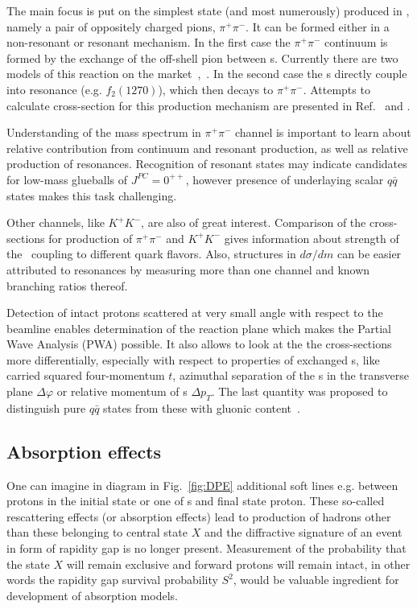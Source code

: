 The main focus is put on the simplest state (and most numerously) produced in \DPE, namely a pair of oppositely charged pions, $\pi^{+}\pi^{-}$. It can be formed either in a non-resonant or resonant mechanism. In the first case the $\pi^{+}\pi^{-}$ continuum is formed by the exchange of the off-shell pion between \Pomeron s. Currently there are two models of this reaction on the market~\cite{LSmodel,LSmodel2},~\cite{DurhamModel}. In the second case the \Pomeron s directly couple into resonance (e.g. $f_{2}(1270)$), which then decays to $\pi^{+}\pi^{-}$. Attempts to calculate cross-section for this production mechanism are presented in Ref.~\cite{LSmodel2} and \cite{Schicker}.

Understanding of the mass spectrum in $\pi^{+}\pi^{-}$ channel is important to learn about relative contribution from continuum and resonant production, as well as relative production of resonances. Recognition of resonant states may indicate candidates for low-mass glueballs of $J^{PC}=0^{++}$, however presence of underlaying scalar $q\bar{q}$ states makes this task challenging.

Other channels, like $K^{+}K^{-}$, are also of great interest. Comparison of the cross-sections for production of $\pi^{+}\pi^{-}$ and $K^{+}K^{-}$ gives information about strength of the \Pomeron\ coupling to different quark flavors. Also, structures in $d\sigma/dm$ can be easier attributed to resonances by measuring more than one channel and known branching ratios thereof.

Detection of intact protons scattered at very small angle with respect to the beamline enables determination of the reaction plane which makes the Partial Wave Analysis (PWA) possible. It also allows to look at the the cross-sections more differentially, especially with respect to properties of exchanged \Pomeron s, like carried squared four-momentum $t$, azimuthal separation of the \Pomeron s in the transverse plane $\Delta\varphi$ or relative momentum of \Pomeron s $\Delta p_{T}$. The last quantity was proposed to distinguish pure $q\bar{q}$ states from these with gluonic content~\cite{DPtFilter}.

\subsection{Absorption effects}

One can imagine in diagram in Fig.~\ref{fig:DPE} additional soft lines e.g. between protons in the initial state or one of \Pomeron s and final state proton. These so-called rescattering effects (or absorption effects) lead to production of hadrons other than these belonging to central state $X$ and the diffractive signature of an event in form of rapidity gap is no longer present. Measurement of the probability that the state $X$ will remain exclusive and forward protons will remain intact, in other words the rapidity gap survival probability $S^{2}$, would be valuable ingredient for development of absorption models.

